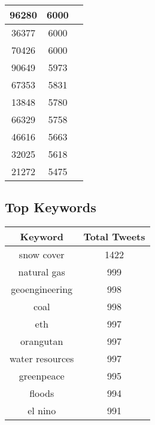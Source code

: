 \documentclass{article}\usepackage[T1]{fontenc}
\begin{document}
\begin{tabular}{|c|c|c|}
 \hline
96280 & 6000\\ 
 \hline
36377 & 6000\\ 
 \hline
70426 & 6000\\ 
 \hline
90649 & 5973\\ 
 \hline
67353 & 5831\\ 
 \hline
13848 & 5780\\ 
 \hline
66329 & 5758\\ 
 \hline
46616 & 5663\\ 
 \hline
32025 & 5618\\ 
 \hline
21272 & 5475\\ 
 \hline
\end{tabular}\subsection*{Top Keywords}\begin{tabular}{|c|c|}         \hline         Keyword & Total Tweets \\ 
 \hline
snow cover & 1422\\ 
 \hline
natural gas & 999\\ 
 \hline
geoengineering & 998\\ 
 \hline
coal & 998\\ 
 \hline
eth & 997\\ 
 \hline
orangutan & 997\\ 
 \hline
water resources & 997\\ 
 \hline
greenpeace & 995\\ 
 \hline
floods & 994\\ 
 \hline
el nino & 991\\ 
 \hline
\end{tabular}
\end{document}
